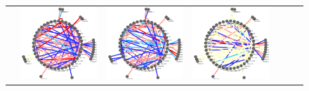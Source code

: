 \documentclass{bioinfo}
\begin{document}
\begin{figure}
\begin{tabular}{lcccccc}
&     \includegraphics[scale=0.15]{results/ref/t4.png}
&     \includegraphics[scale=0.15]{results/ref/t5.png}
&     \includegraphics[scale=0.15]{results/ref/t6.png} \\

\end{tabular}
\end{figure}
\end{document}
